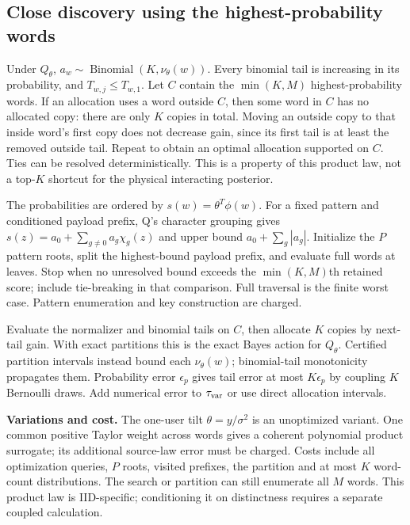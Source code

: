 \documentclass[10pt,a4paper]{article}
\begin{document}
\subsection{Close discovery using the highest-probability words}
Under $Q_\theta$, $a_w\sim\operatorname{Binomial}(K,\nu_\theta(w))$.
Every binomial tail is increasing in its probability, and
$T_{w,j}\leq T_{w,1}$. Let $C$ contain the $\min(K,M)$ highest-probability words.
If an allocation uses a word outside $C$, then some word in $C$ has no allocated copy: there are only
$K$ copies in total. Moving an outside copy to that inside word's first copy does not decrease gain,
since its first tail is at least the removed outside tail. Repeat to obtain an optimal allocation
supported on $C$. Ties can be resolved deterministically. This is a property of this product law,
not a top-$K$ shortcut for the physical interacting posterior.

The probabilities are ordered by $s(w)=\theta^T\phi(w)$.
For a fixed pattern and conditioned payload prefix, Q's character grouping gives
$s(z)=a_0+\sum_{g\ne0}a_g\chi_g(z)$ and upper bound $a_0+\sum_g|a_g|$.
Initialize the $P$ pattern roots, split the highest-bound payload prefix, and evaluate full words at
leaves. Stop when no unresolved bound exceeds the $\min(K,M)$th retained score; include tie-breaking in that
comparison. Full traversal is the finite worst case. Pattern enumeration and key construction are charged.

Evaluate the normalizer and binomial tails on $C$, then allocate $K$ copies by next-tail gain.
With exact partitions this is the exact Bayes action for $Q_\theta$.
Certified partition intervals instead bound each $\nu_\theta(w)$; binomial-tail monotonicity propagates
them. Probability error $\epsilon_p$ gives tail error at most $K\epsilon_p$ by coupling $K$ Bernoulli draws.
Add numerical error to $\tau_{\rm var}$ or use direct allocation intervals.

\textbf{Variations and cost.} The one-user tilt $\theta=y/\sigma^2$ is an unoptimized variant.
One common positive Taylor weight across words gives a coherent polynomial product surrogate; its
additional source-law error must be charged.
Costs include all optimization queries, $P$ roots, visited prefixes, the partition and at most $K$
word-count distributions. The search or partition can still enumerate all $M$ words.
This product law is IID-specific; conditioning it on distinctness requires a separate coupled calculation.

\newpage
\end{document}
